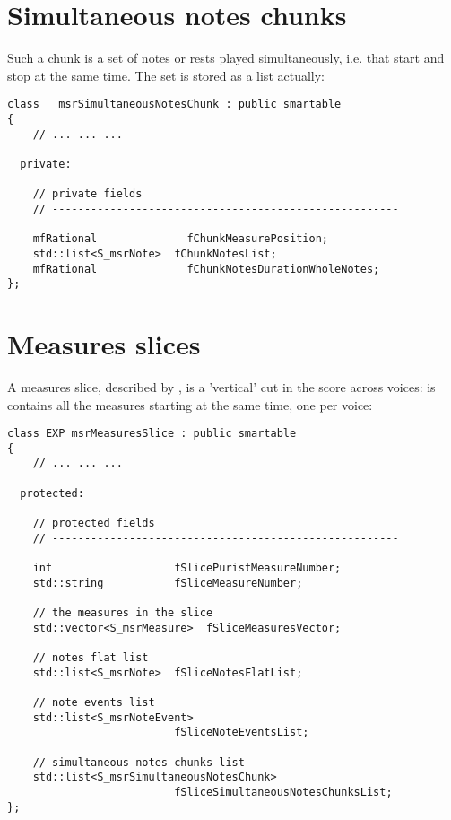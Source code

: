 \section{Simultaneous notes chunks}

Such a chunk is a set of notes or rests played simultaneously, i.e. that start and stop at the same time. The set is stored as a list actually:
\begin{lstlisting}[language=CPlusPlus]
class   msrSimultaneousNotesChunk : public smartable
{
	// ... ... ...

  private:

    // private fields
    // ------------------------------------------------------

    mfRational              fChunkMeasurePosition;
    std::list<S_msrNote>  fChunkNotesList;
    mfRational              fChunkNotesDurationWholeNotes;
};
\end{lstlisting}


\section{Measures slices}

A measures slice, described by , is a 'vertical' cut in the score across voices: is contains all the measures starting at the same time, one per voice:
\begin{lstlisting}[language=CPlusPlus]
class EXP msrMeasuresSlice : public smartable
{
	// ... ... ...

  protected:

    // protected fields
    // ------------------------------------------------------

    int                   fSlicePuristMeasureNumber;
    std::string           fSliceMeasureNumber;

    // the measures in the slice
    std::vector<S_msrMeasure>  fSliceMeasuresVector;

    // notes flat list
    std::list<S_msrNote>  fSliceNotesFlatList;

    // note events list
    std::list<S_msrNoteEvent>
                          fSliceNoteEventsList;

    // simultaneous notes chunks list
    std::list<S_msrSimultaneousNotesChunk>
                          fSliceSimultaneousNotesChunksList;
};

\end{lstlisting}


